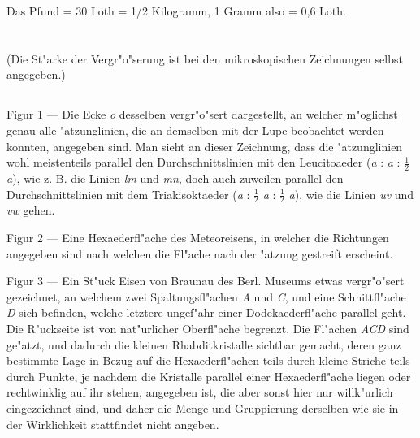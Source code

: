 \documentclass[a4paper, 11pt, oneside]{article}
\begin{document}
\begin{center}
Das Pfund = 30 Loth = 1/2 Kilogramm, 1 Gramm also = 0,6 Loth.
\end{center}
\clearpage
\section{}
\begin{center}
(Die St"arke der Vergr"o"serung ist bei den mikroskopischen Zeichnungen selbst angegeben.)
\end{center}
\subsection{}
\paragraph{}
Figur 1 --- Die Ecke \emph{o} desselben vergr"o"sert dargestellt, an welcher m"oglichst genau alle "atzunglinien, die an demselben mit der Lupe beobachtet werden konnten, angegeben sind. Man sieht an dieser Zeichnung, dass die "atzunglinien wohl meistenteils parallel den Durchschnittslinien mit den Leucitoaeder (\emph{a} : \emph{a} : $\mathfrak{\frac{1}{2}}$ \emph{a}), wie z. B. die Linien \emph{lm} und \emph{mn}, doch auch zuweilen parallel den Durchschnittslinien mit dem Triakisoktaeder (\emph{a} : $\mathfrak{\frac{1}{2}}$ \emph{a} : $\mathfrak{\frac{1}{2}}$ \emph{a}), wie die Linien \emph{uv} und \emph{vw} gehen.

Figur 2 --- Eine Hexaederfl"ache des Meteoreisens, in welcher die Richtungen angegeben sind nach welchen die Fl"ache nach der "atzung gestreift erscheint.

Figur 3 --- Ein St"uck Eisen von Braunau des Berl. Museums etwas vergr"o"sert gezeichnet, an welchem zwei Spaltungsfl"achen \emph{A} und \emph{C}, und eine Schnittfl"ache \emph{D} sich befinden, welche letztere ungef"ahr einer Dodekaederfl"ache parallel geht. Die R"uckseite ist von nat"urlicher Oberfl"ache begrenzt. Die Fl"achen \emph{ACD} sind ge"atzt, und dadurch die kleinen Rhabditkristalle sichtbar gemacht, deren ganz bestimmte Lage in Bezug auf die Hexaederfl"achen teils durch kleine Striche teils durch Punkte, je nachdem die Kristalle parallel einer Hexaederfl"ache liegen oder rechtwinklig auf ihr stehen, angegeben ist, die aber sonst hier nur willk"urlich eingezeichnet sind, und daher die Menge und Gruppierung derselben wie sie in der Wirklichkeit stattfindet nicht angeben.
\end{document}
